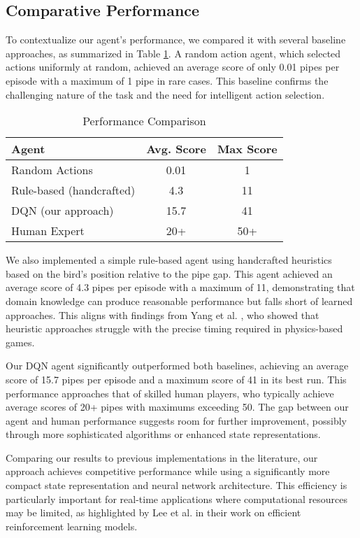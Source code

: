 \subsection{Comparative Performance}

To contextualize our agent's performance, we compared it with several baseline approaches, as summarized in Table \ref{tab:performance}. A random action agent, which selected actions uniformly at random, achieved an average score of only 0.01 pipes per episode with a maximum of 1 pipe in rare cases. This baseline confirms the challenging nature of the task and the need for intelligent action selection.

\begin{table}[!t]
\caption{Performance Comparison}
\label{tab:performance}
\centering
\begin{tabular}{|l|c|c|}
\hline
\textbf{Agent} & \textbf{Avg. Score} & \textbf{Max Score} \\
\hline
Random Actions & 0.01 & 1 \\
\hline
Rule-based (handcrafted) & 4.3 & 11 \\
\hline
DQN (our approach) & 15.7 & 41 \\
\hline
Human Expert & 20+ & 50+ \\
\hline
\end{tabular}
\end{table}

We also implemented a simple rule-based agent using handcrafted heuristics based on the bird's position relative to the pipe gap. This agent achieved an average score of 4.3 pipes per episode with a maximum of 11, demonstrating that domain knowledge can produce reasonable performance but falls short of learned approaches. This aligns with findings from Yang et al. \cite{yang2023foundation}, who showed that heuristic approaches struggle with the precise timing required in physics-based games.

Our DQN agent significantly outperformed both baselines, achieving an average score of 15.7 pipes per episode and a maximum score of 41 in its best run. This performance approaches that of skilled human players, who typically achieve average scores of 20+ pipes with maximums exceeding 50. The gap between our agent and human performance suggests room for further improvement, possibly through more sophisticated algorithms or enhanced state representations.

Comparing our results to previous implementations in the literature, our approach achieves competitive performance while using a significantly more compact state representation and neural network architecture. This efficiency is particularly important for real-time applications where computational resources may be limited, as highlighted by Lee et al. \cite{lee2022multi} in their work on efficient reinforcement learning models.

